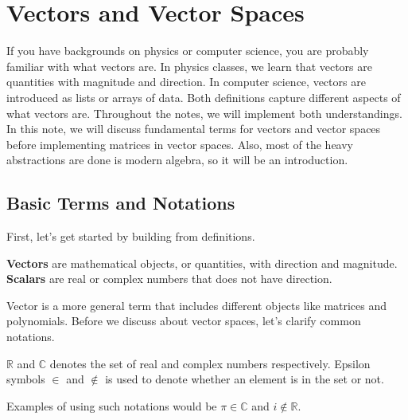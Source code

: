 \documentclass[../main.tex]{subfiles}
\begin{document}
\chapter{Vectors and Vector Spaces}

If you have backgrounds on physics or computer science, you are
probably familiar with what vectors are. In physics classes,
we learn that vectors are quantities with magnitude and direction.
In computer science, vectors are introduced as lists or arrays of
data. Both definitions capture different aspects of what vectors
are. Throughout the notes, we will implement both understandings.
In this note, we will discuss fundamental terms for vectors and
vector spaces before implementing matrices in vector spaces.
Also, most of the heavy abstractions are done is modern algebra,
so it will be an introduction.

\section{Basic Terms and Notations}

First, let's get started by building from definitions.

\begin{definition}
\textbf{Vectors} are mathematical objects, or quantities, with
direction and magnitude. \textbf{Scalars} are real or complex
numbers that does not have direction.
\end{definition}

Vector is a more general term that includes different objects like
matrices and polynomials. Before we discuss about vector spaces,
let's clarify common notations.

\begin{definition}
$\mathbb{R}$ and $\mathbb{C}$ denotes the set of real and complex
numbers respectively. Epsilon symbols $\in$ and $\notin$ is used to
denote whether an element is in the set or not.
\end{definition}

Examples of using such notations would be $\pi \in \mathbb{C}$
and $i \notin \mathbb{R}$.
\end{document}
